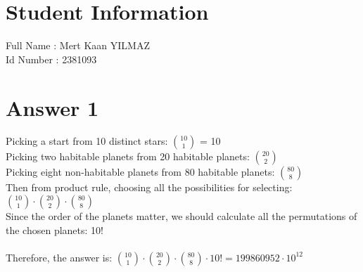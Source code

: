 \documentclass[11pt]{article}
\begin{document}
\section*{Student Information } 
Full Name :  Mert Kaan YILMAZ\\
Id Number :  2381093\\

\section*{Answer 1}
Picking a start from 10 distinct stars: $\binom{10}{1}$ = 10\\
Picking two habitable planets from 20 habitable planets: $\binom{20}{2}$\\
Picking eight non-habitable planets from 80 habitable planets: $\binom{80}{8}$\\
Then from product rule, choosing all the possibilities for selecting: $\binom{10}{1}\cdot\binom{20}{2}\cdot\binom{80}{8}$\\
Since the order of the planets matter, we should calculate all the permutations of the chosen planets: 10!\\\\
Therefore, the answer is: $\binom{10}{1}\cdot\binom{20}{2}\cdot\binom{80}{8}\cdot10! = 199860952\cdot10^{12}$
\end{document}
